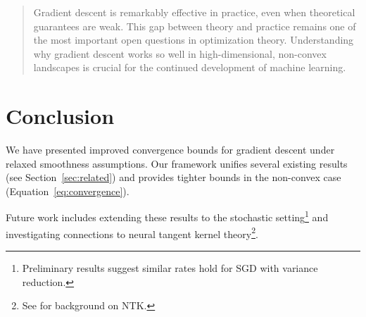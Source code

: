 \documentclass[11pt]{article}
\begin{document}
\begin{quotation}
Gradient descent is remarkably effective in practice, even when theoretical
guarantees are weak. This gap between theory and practice remains one of the
most important open questions in optimization theory. Understanding why
gradient descent works so well in high-dimensional, non-convex landscapes
is crucial for the continued development of machine learning.
\end{quotation}

\section{Conclusion}\label{sec:conclusion}

We have presented improved convergence bounds for gradient descent under
relaxed smoothness assumptions. Our framework unifies several existing
results (see Section~\ref{sec:related}) and provides tighter bounds in
the non-convex case (Equation~\eqref{eq:convergence}).

Future work includes extending these results to the stochastic
setting\footnote{Preliminary results suggest similar rates hold for SGD
with variance reduction.} and investigating connections to neural tangent
kernel theory\footnote{See \cite{jacot2018} for background on NTK.}.
\end{document}

